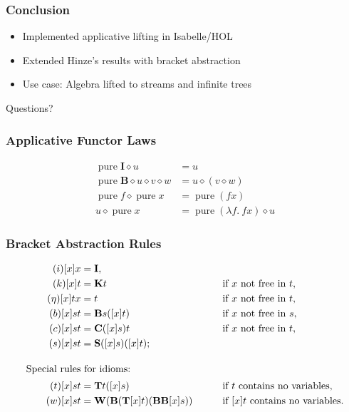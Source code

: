 \documentclass[smaller,leqno]{beamer}
\DeclareMathOperator{\pure}{pure}
\newcommand{\ap}{\diamond}
\begin{document}
\begin{frame}
\frametitle{Conclusion}
\begin{itemize}
\item Implemented applicative lifting in Isabelle/HOL
\item Extended Hinze's results with bracket abstraction
\item Use case: Algebra lifted to streams and infinite trees
\end{itemize}

\vspace{10mm}
\begin{center}\large Questions?\end{center}
\end{frame}

\appendix %

\begin{frame}
\frametitle{Applicative Functor Laws}

\begin{align*}
	\tag{identity} \pure{\mathbf{I}} \ap u &= u \\[1ex]
	\tag{composition} \pure{\mathbf{B}} \ap u \ap v \ap w &= u \ap (v \ap w) \\[1ex]
	\tag{homomorphism} \pure{f} \ap \pure x &= \pure{(f x)} \\[1ex]
	\tag{interchange} u \ap \pure{x} &= \pure{(\lambda f.\> f x)} \ap u
\end{align*}
\end{frame}

\begin{frame}
\frametitle{Bracket Abstraction Rules}

\begin{alignat*}{2}
	\tag{$i$} [x]x &= \mathbf{I}, && \\
	\tag{$k$} [x]t &= \mathbf{K} t &&\qquad\text{if $x$ not free in $t$}, \\
	\tag{$\eta$} [x]tx &= t &&\qquad\text{if $x$ not free in $t$}, \\
	\tag{$b$} [x]st &= \mathbf{B}s([x]t) &&\qquad\text{if $x$ not free in $s$}, \\
	\tag{$c$} [x]st &= \mathbf{C}([x]s)t &&\qquad\text{if $x$ not free in $t$}, \\
	\tag{$s$} [x]st &= \mathbf{S}([x]s)([x]t); && \\[2ex]
\intertext{Special rules for idioms:}
	\tag{$t$} [x]st &= \mathbf{T}t([x]s) &&\qquad\text{if $t$ contains no variables}, \\
	\tag{$w$} [x]st &= \mathbf{W}(\mathbf{B}(\mathbf{T}[x]t)(\mathbf{B}\mathbf{B}[x]s))
		&&\qquad\text{if $[x]t$ contains no variables}.
\end{alignat*}
\end{frame}
\end{document}

